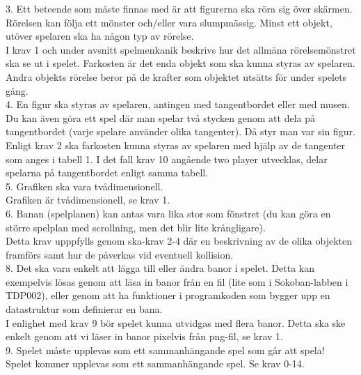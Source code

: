\documentclass{TDP005mall}
\begin{document}
3. Ett beteende som måste finnas med är att figurerna ska röra sig över skärmen. Rörelsen kan följa ett mönster och/eller vara slumpmässig. Minst ett objekt, utöver spelaren ska ha någon typ av rörelse.\\
I krav 1 och under avsnitt spelmenkanik beskrivs hur det allmäna rörelsemönstret ska se ut i spelet. Farkosten är det enda objekt som ska kunna styras av spelaren. Andra objekts rörelse beror på de krafter som objektet utsätts för under spelets gång.\\

4. En figur ska styras av spelaren, antingen med tangentbordet eller med musen. Du kan även göra ett spel där man spelar två stycken genom att dela på tangentbordet (varje spelare använder olika tangenter). Då styr man var sin figur.\\
Enligt krav 2 ska farkosten kunna styras av spelaren med hjälp av de tangenter som anges i tabell 1. I det fall krav 10 angående two player utvecklas, delar spelarna på tangentbordet enligt samma tabell.\\

5. Grafiken ska vara tvådimensionell.\\
Grafiken är tvådimensionell, se krav 1.\\

6. Banan (spelplanen) kan antas vara lika stor som fönstret (du kan göra en större spelplan med scrollning, men det blir lite krångligare).\\
Detta krav upppfylls genom ska-krav 2-4 där en beskrivning av de olika objekten framförs samt hur de påverkas vid eventuell kollision.\\

8. Det ska vara enkelt att lägga till eller ändra banor i spelet. Detta kan exempelvis lösas genom att läsa in banor från en fil (lite som i Sokoban-labben i TDP002), eller genom att ha funktioner i programkoden som bygger upp en datastruktur som definierar en bana.\\
I enlighet med krav 9 bör spelet kunna utvidgas med flera banor. Detta ska ske enkelt genom att vi läser in banor pixelvis från png-fil, se krav 1.\\

9. Spelet måste upplevas som ett sammanhängande spel som går att spela!\\
Spelet kommer upplevas som ett sammanhängande spel. Se krav 0-14. 
\end{document}
